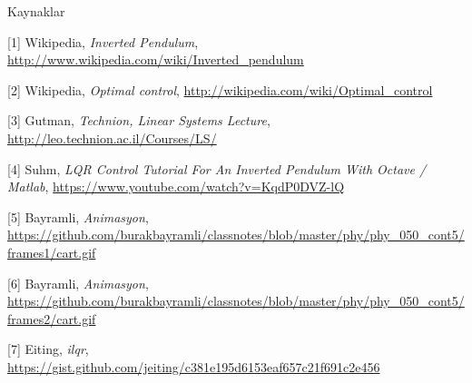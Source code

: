 \documentclass[12pt,fleqn]{article}\usepackage{../../common}
\begin{document}
Kaynaklar

[1] Wikipedia, {\em Inverted Pendulum}, \url{http://www.wikipedia.com/wiki/Inverted_pendulum}

[2] Wikipedia, {\em Optimal control}, \url{http://wikipedia.com/wiki/Optimal_control}

[3] Gutman, {\em Technion, Linear Systems Lecture}, \url{http://leo.technion.ac.il/Courses/LS/}

[4] Suhm, {\em LQR Control Tutorial For An Inverted Pendulum With Octave /
  Matlab}, \url{https://www.youtube.com/watch?v=KqdP0DVZ-lQ}

[5] Bayramli, {\em Animasyon}, \url{https://github.com/burakbayramli/classnotes/blob/master/phy/phy_050_cont5/frames1/cart.gif}

[6] Bayramli, {\em Animasyon}, \url{https://github.com/burakbayramli/classnotes/blob/master/phy/phy_050_cont5/frames2/cart.gif}

[7] Eiting, {\em ilqr}, \url{https://gist.github.com/jeiting/c381e195d6153eaf657c21f691c2e456}
\end{document}
